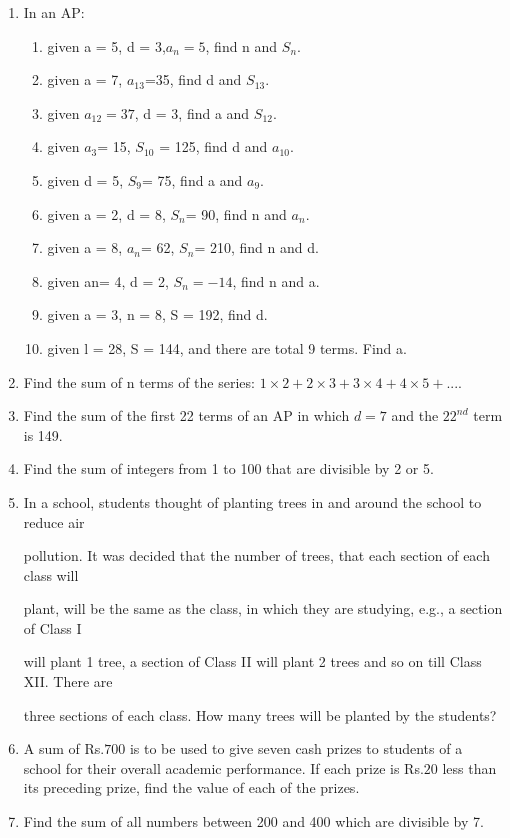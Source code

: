 \begin{enumerate}[label=\thechapter.\arabic*,ref=\thechapter.\theenumi]
\item In an AP:
\begin{enumerate}
\item given a = 5, d = 3,$a_n=5$, find n and $S_n$.
\item given a = 7, $a_{13}$=35, find d and $S_{13}$.
\item given $a_{12}=37$, d = 3, find a and $S_{12}$.
\item given $a_3$= 15, $S_{10}$ = 125, find d and $a_{10}$.
\item given d = 5, $S_9$= 75, find a and $a_9$.
\item given a = 2, d = 8, $S_n$= 90, find n and $a_n$.
\item given a = 8, $a_n$= 62, $S_n$= 210, find n and d.
\item given an= 4, d = 2, $S_n=-14$, find n and a.
\item given a = 3, n = 8, S = 192, find d.
\item given l = 28, S = 144, and there are total 9 terms. Find a.\\
\end{enumerate}
\solution
\pagebreak

\item Find the sum of n terms of the series:
$1\times2+2\times3+3\times4+4\times5+....$\\
\solution
\pagebreak
\item Find the sum of the first 22 terms of an AP in which $d = 7$ and the $22^{nd}$ term is 149.\\
\solution
\pagebreak

\item Find the sum of integers from 1 to 100 that are divisible by 2 or 5.\\
\solution
\pagebreak

\item In a school, students thought of planting trees in and around the school to reduce air

pollution. It was decided that the number of trees, that each section of each class will

plant, will be the same as the class, in which they are studying, e.g., a section of Class I

will plant 1 tree, a section of Class II will plant 2 trees and so on till Class XII. There are

three sections of each class. How many trees will be planted by the students?\\
\solution
\pagebreak
\item A sum of Rs.$700$ is to be used to give seven cash prizes to students of a school for their overall academic performance. If each prize is Rs.$20$ less than its preceding prize, find the value of each of the prizes. \\
\solution
\pagebreak

\item Find the sum of all numbers between 200 and 400 which are divisible by 7.\\
\solution
\pagebreak
\end{enumerate}
